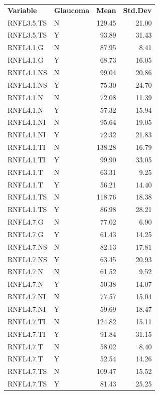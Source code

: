 \documentclass[jcm,article,submit,moreauthors,pdftex]{Definitions/mdpi}
\begin{document}
\begin{table}[ht]
\begin{tabular}{llrr}
\end{tabular}
\qquad
\begin{tabular}{llrr}
  \toprule
\bf Variable & \bf Glaucoma & \bf Mean & \bf Std.Dev \\ 
  RNFL3.5.TS & N & 129.45 & 21.00 \\ 
  RNFL3.5.TS & Y & 93.89 & 31.43 \\ 
  RNFL4.1.G & N & 87.95 & 8.41 \\ 
  RNFL4.1.G & Y & 68.73 & 16.05 \\ 
  RNFL4.1.NS & N & 99.04 & 20.86 \\ 
  RNFL4.1.NS & Y & 75.30 & 24.70 \\ 
  RNFL4.1.N & N & 72.08 & 11.39 \\ 
  RNFL4.1.N & Y & 57.32 & 15.94 \\ 
  RNFL4.1.NI & N & 95.64 & 19.05 \\ 
  RNFL4.1.NI & Y & 72.32 & 21.83 \\ 
  RNFL4.1.TI & N & 138.28 & 16.79 \\ 
  RNFL4.1.TI & Y & 99.90 & 33.05 \\ 
  RNFL4.1.T & N & 63.31 & 9.25 \\ 
  RNFL4.1.T & Y & 56.21 & 14.40 \\ 
  RNFL4.1.TS & N & 118.76 & 18.38 \\ 
  RNFL4.1.TS & Y & 86.98 & 28.21 \\ 
  RNFL4.7.G & N & 77.02 & 6.90 \\ 
  RNFL4.7.G & Y & 61.43 & 14.25 \\ 
  RNFL4.7.NS & N & 82.13 & 17.81 \\ 
  RNFL4.7.NS & Y & 63.45 & 20.93 \\ 
  RNFL4.7.N & N & 61.52 & 9.52 \\ 
  RNFL4.7.N & Y & 50.38 & 14.07 \\ 
  RNFL4.7.NI & N & 77.57 & 15.04 \\ 
  RNFL4.7.NI & Y & 59.69 & 18.47 \\ 
  RNFL4.7.TI & N & 124.82 & 15.11 \\ 
  RNFL4.7.TI & Y & 91.84 & 31.15 \\ 
  RNFL4.7.T & N & 58.02 & 8.40 \\ 
  RNFL4.7.T & Y & 52.54 & 14.26 \\ 
  RNFL4.7.TS & N & 109.47 & 15.52 \\ 
  RNFL4.7.TS & Y & 81.43 & 25.25 \\ 
   \bottomrule
\end{tabular}
\end{table}
\end{document}
